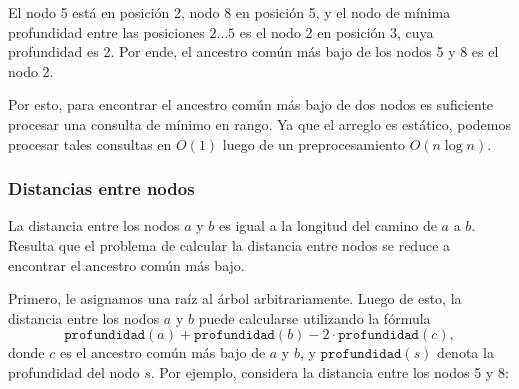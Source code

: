 El nodo 5 está en posición 2, nodo 8 en posición 5, y el nodo de
mínima profundidad entre las posiciones $2 \ldots 5$ es el nodo 2
en posición 3, cuya profundidad es 2. Por ende, el ancestro común
más bajo de los nodos 5 y 8 es el nodo 2.

Por esto, para encontrar el ancestro común más bajo de dos nodos
es suficiente procesar una consulta de mínimo en rango. Ya que el
arreglo es estático, podemos procesar tales consultas en $O(1)$
luego de un preprocesamiento $O(n \log n)$.

\subsubsection{Distancias entre nodos}

La distancia entre los nodos $a$ y $b$ es igual a la longitud del camino
de $a$ a $b$. Resulta que el problema de calcular la distancia entre
nodos se reduce a encontrar el ancestro común más bajo.

Primero, le asignamos una raíz al árbol arbitrariamente. Luego de esto,
la distancia entre los nodos $a$ y $b$ puede calcularse utilizando la
fórmula
\[\texttt{profundidad}(a)+\texttt{profundidad}(b)-2 \cdot \texttt{profundidad}(c),\]
donde $c$ es el ancestro común más bajo de $a$ y $b$, y
$\texttt{profundidad}(s)$ denota la profundidad del nodo $s$.
Por ejemplo, considera la distancia entre los nodos 5 y 8:
\begin{center}
\end{center}

